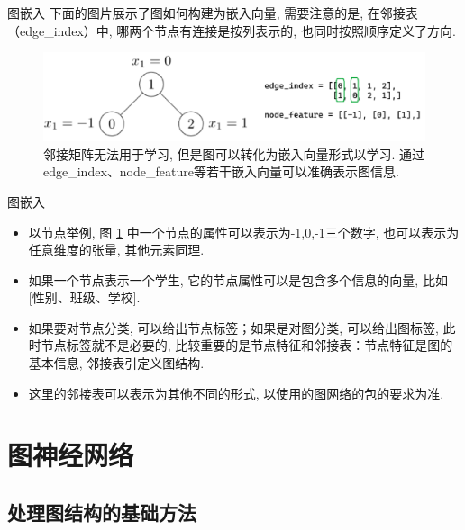 \documentclass{beamer}
\begin{document}
\begin{frame}{图嵌入}
    下面的图片展示了图如何构建为嵌入向量, 需要注意的是, 在邻接表（edge\_index）中, 哪两个节点有连接是按列表示的, 也同时按照顺序定义了方向.
    \begin{figure}
        \includegraphics[width=\textwidth]{graph_sample.png}
        \caption{邻接矩阵无法用于学习, 但是图可以转化为嵌入向量形式以学习. 通过edge\_index、node\_feature等若干嵌入向量可以准确表示图信息. }\label{图嵌入}
    \end{figure}
\end{frame}

\begin{frame}{图嵌入}
    \begin{itemize}[<+-| alert@+>]
        \item 以节点举例, 图 \ref{图嵌入} 中一个节点的属性可以表示为-1,0,-1三个数字, 也可以表示为任意维度的张量, 其他元素同理.
        \item 如果一个节点表示一个学生, 它的节点属性可以是包含多个信息的向量, 比如[性别、班级、学校].
        \item 如果要对节点分类, 可以给出节点标签；如果是对图分类, 可以给出图标签, 此时节点标签就不是必要的, 比较重要的是节点特征和邻接表：节点特征是图的基本信息, 邻接表引定义图结构.
        \item 这里的邻接表可以表示为其他不同的形式, 以使用的图网络的包的要求为准.
    \end{itemize}
\end{frame}

\section{图神经网络}

\subsection{处理图结构的基础方法}
\end{document}
